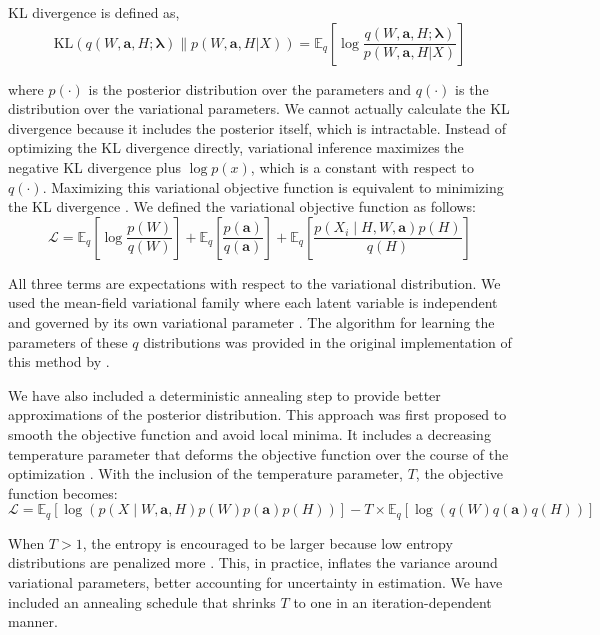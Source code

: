 KL divergence is defined as,
\begin{equation}
\mathrm{KL}(q(W, \mathbf{a}, H ; \boldsymbol{\lambda}) \| p(W, \mathbf{a}, H | X))=\mathbb{E}_{q}\left[\log \frac{q(W, \mathbf{a}, H ; \boldsymbol{\lambda})}{p(W, \mathbf{a}, H | X)}\right]
\end{equation} 

where $p(\cdot)$ is the posterior distribution over the parameters and $q(\cdot)$ is the distribution over the variational parameters. We cannot actually calculate the KL divergence because it includes the posterior itself, which is intractable. Instead of optimizing the KL divergence directly, variational inference maximizes the negative KL divergence plus $\log p(x)$, which is a constant with respect to $q(\cdot)$. Maximizing this variational objective function is equivalent to minimizing the KL divergence \citep{blei2017variational}. We defined the variational objective function as follows:
\begin{equation}
\mathcal{L}=\mathbb{E}_{q}\left[\log \frac{p(W)}{q(W)}\right]+\mathbb{E}_{q}\left[\frac{p(\mathbf{a})}{q(\mathbf{a})}\right]+\mathbb{E}_{q}\left[\frac{p\left(X_{i} \mid H, W, \mathbf{a}\right) p(H)}{q(H)}\right]
\end{equation}

All three terms are expectations with respect to the variational distribution. We used the mean-field variational family where each latent variable is independent and governed by its own variational parameter \citep{jordan1999introduction, paisley2014bayesian}. The algorithm for learning the parameters of these $q$ distributions was provided in the original implementation of this method by \citet{holtzman2018machine}.

We have also included a deterministic annealing step to provide better approximations of the posterior distribution. This approach was first proposed to smooth the objective function and avoid local minima. It includes a decreasing temperature parameter that deforms the objective function over the course of the optimization \citep{rose1990deterministic}. With the inclusion of the temperature parameter, $T$, the objective function becomes:
\begin{equation}
\mathcal{L} = \mathbb{E}_{q}
\left[\log\left(p(X \mid W, \mathbf{a}, H)p(W)p(\mathbf{a})p(H)\right)\right] - T \times
\mathbb{E}_{q}\left[\log\left(q(W)q(\mathbf{a})q(H)\right)\right]
\end{equation}

When $T > 1$, the entropy is encouraged to be larger because low entropy distributions are penalized more \citep{mandt2016variational}. This, in practice, inflates the variance around variational parameters, better accounting for uncertainty in estimation. We have included an annealing schedule that shrinks $T$ to one in an iteration-dependent manner.

